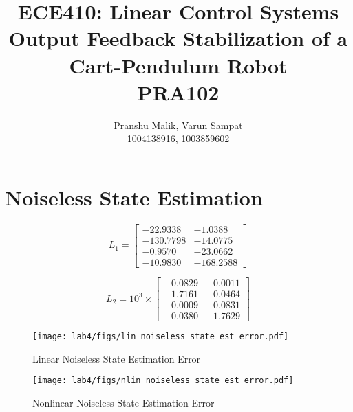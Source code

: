 \documentclass[10pt]{article}
\date{}
\newcommand{\figscalingfactor}{0.85}
\begin{document}
\title{\textbf{\Large{\textsc{ECE410:} Linear Control Systems}} \\ \Large{Output Feedback Stabilization of a Cart-Pendulum Robot} \\ \textbf{\small{PRA102}}\vspace{-0.3cm}}
\author{Pranshu Malik, Varun Sampat \\ \footnotesize{1004138916}, \footnotesize{1003859602}\vspace{-3cm}}

\maketitle

\section{Noiseless State Estimation}

\begin{equation*}
    L_1 = \begin{bmatrix}
    -22.9338 & -1.0388 \\
    -130.7798 & -14.0775 \\ 
    -0.9570 & -23.0662 \\ 
    -10.9830 & -168.2588
    \end{bmatrix}
\end{equation*}

\begin{equation*}
    L_2 = 10^{3} \times \begin{bmatrix}
    -0.0829  & -0.0011 \\
    -1.7161  & -0.0464 \\ 
    -0.0009  & -0.0831 \\ 
    -0.0380  & -1.7629
    \end{bmatrix}
\end{equation*}

\begin{figure}
    \centering
    \texttt{[image: lab4/figs/lin\_noiseless\_state\_est\_error.pdf]}
    \caption{Linear Noiseless State Estimation Error}
    \label{fig:lin_noiseless_state_est_error}
\end{figure}

\begin{figure}
    \centering
    \texttt{[image: lab4/figs/nlin\_noiseless\_state\_est\_error.pdf]}
    \caption{Nonlinear Noiseless State Estimation Error}
    \label{fig:nlin_noiseless_state_est_error}
\end{figure}
\end{document}
